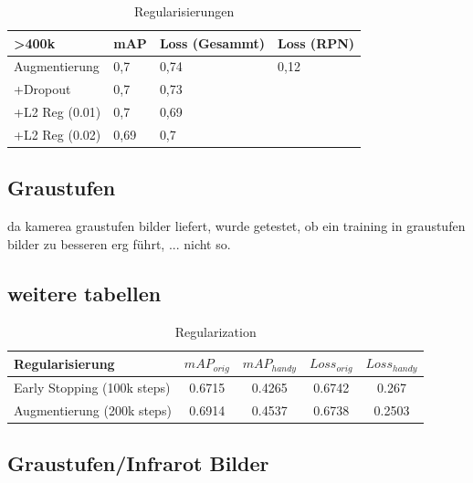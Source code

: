 \begin{table}[htb]
  \centering
  \label{table:reg}
  \begin{tabular}{m{}|m{}<{\centering}m{}<{\centering}m{}<{\centering}}
  \hline
  \textgreater 400k & mAP  & Loss (Gesammt) & Loss (RPN) \\ \hline\hline
  Augmentierung     & 0,7  & 0,74           &  0,12          \\
  +Dropout          & 0,7  & 0,73           &            \\
  +L2 Reg (0.01)    & 0,7  & 0,69           &            \\
  +L2 Reg (0.02)    & 0,69 & 0,7            &            \\ \hline
  \end{tabular}
  \caption{Regularisierungen}
\end{table}

\subsection{Graustufen}
da kamerea graustufen bilder liefert, wurde getestet, ob ein 
training in graustufen bilder zu besseren erg führt, ... nicht so.



\subsection{weitere tabellen}\label{subsec:regularisierung}



\begin{table}[htb]
    \centering
    \label{tab:regularization}
    \begin{tabular}{| l || c | c | c | c |} 
        \hline
        Regularisierung & $mAP_{orig}$ & $mAP_{handy}$ & $Loss_{orig}$ &  $Loss_{handy}$\\
        \hline
        Early Stopping (100k steps) & 0.6715 & 0.4265 & 0.6742 & 0.267\\
        \hline
        Augmentierung (200k steps) & 0.6914 & 0.4537 & 0.6738 & 0.2503\\ %
        \hline
    \end{tabular}        
    \caption{Regularization}
\end{table}




\subsection{Graustufen/Infrarot Bilder}\label{subsec:eval_gray}


